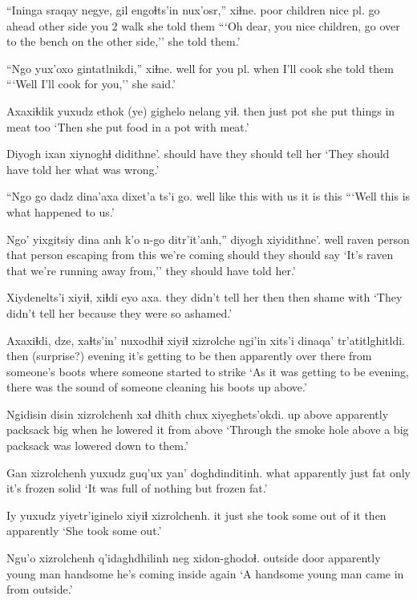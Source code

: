 \documentclass[12pt]{article}
\begin{document}
\gll ``Ininga sraqay negye, gil engoɬts'in nux'osr,'' xiɬne.
poor children {nice pl.} {go ahead} {other side} {you 2 walk} {she told them}
\glt ```Oh dear, you nice children, go over to the bench on the other side,'' she told them.'
\glend

\gll ``Ngo yux'oxo gintatlnikdi,'' xiɬne.
well {for you pl.} {when I'll cook} {she told them}
\glt ```Well I'll cook for you,'' she said.'
\glend

\gll Axaxiɬdik yuxudz ethok (ye) gighelo nelang yiɬ.
then just pot {she put things} in meat too
\glt `Then she put food in a pot with meat.'
\glend

\gll Diyogh ixan {xiynoghɬ didithne'.}
{should have} {} {they should tell her}
\glt `They should have told her what was wrong.'
\glend

\gll ``Ngo {go dadz} dina'axa dixet'a ts'i go.
well {like this} {with us} {it is} {} this
\glt ```Well this is what happened to us.'
\glend

\gll Ngo' yixgitsiy dina anh k'o n-go ditr'it'anh,'' diyogh xiyidithne'.
well raven person {that person} {escaping from} this {we're coming} should {they should say}
\glt `It's raven that we're running away from,'' they should have told her.'
\glend

\gll Xiydenelts'i xiyiɬ, xiɬdi eyo axa.
{they didn't tell her} then then shame with
\glt `They didn't tell her because they were so ashamed.'
\glend

\gll Axaxiɬdi, dze, xaɬts'in' nuxodhiɬ xiyiɬ xizrolche ngi'in xits'i dinaqa' tr'atitlghitldi.
then {(surprise?)} evening {it's getting to be} then apparently {over there} from {someone's boots} {where someone started to strike}
\glt `As it was getting to be evening, there was the sound of someone cleaning his boots up above.'
\glend

\gll Ngidisin disin xizrolchenh {xaɬ dhith} chux xiyeghets'okdi.
{up above} {} apparently packsack big {when he lowered it from above}
\glt `Through the smoke hole above a big packsack was lowered down to them.'
\glend

\gll Gan xizrolchenh yuxudz guq'ux yan' doghdinditinh.
what apparently just fat only {it's frozen solid}
\glt `It was full of nothing but frozen fat.'
\glend

\gll Iy yuxudz yiyetr'iginelo xiyiɬ xizrolchenh.
it just {she took some out of it} then apparently
\glt `She took some out.'
\glend

\gll Ngu'o xizrolchenh q'idaghdhilinh neg xidon-ghodoɬ.
{outside door} apparently {young man} handsome {he's coming inside again}
\glt `A handsome young man came in from outside.'
\glend
\end{document}
